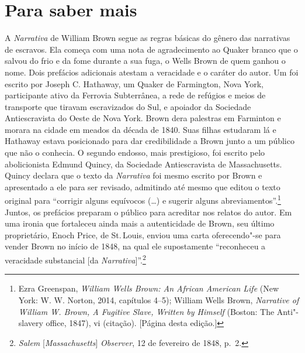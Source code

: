 \part{Para saber mais}


A \emph{Narrativa} de William Brown segue as regras básicas do gênero
das narrativas de escravos. Ela começa com uma nota de agradecimento ao
Quaker branco que o salvou do frio e da fome durante a sua fuga, o Wells %
Brown de quem ganhou o nome. Dois prefácios adicionais atestam a
veracidade e o caráter do autor. Um foi escrito por Joseph C. Hathaway,
um Quaker de Farmington, Nova York, participante ativo da Ferrovia
Subterrânea, a rede de refúgios e meios de transporte que tiravam
escravizados do Sul, e apoiador da Sociedade Antiescravista do Oeste de Nova
York. Brown dera palestras em Farminton e morara na cidade em meados da
década de 1840. Suas filhas estudaram lá e Hathaway estava posicionado
para dar credibilidade a Brown junto a um público que não o conhecia. O
segundo endosso, mais prestigioso, foi escrito pelo abolicionista Edmund
Quincy, da Sociedade Antiescravista de Massachusetts. Quincy declara que
o texto da \emph{Narrativa} foi mesmo escrito por Brown e apresentado a
ele para ser revisado, admitindo até mesmo que editou o texto original
para ``corrigir alguns equívocos (\ldots{}) e sugerir alguns
abreviamentos''.\footnote{Ezra Greenspan, \emph{William Wells Brown: An
  African American Life} (New York: W. W. Norton, 2014, capítulos 4--5);
  William Wells Brown, \emph{Narrative of William W. Brown, A Fugitive
  Slave, Written by Himself} (Boston: The Anti"-slavery office, 1847), vi
  (citação). {[}Página \pageref{ref1} desta edição.{]}} Juntos, os prefácios
preparam o público para acreditar nos relatos do autor. Em uma ironia
que fortaleceu ainda mais a autenticidade de Brown, seu último
proprietário, Enoch Price, de St.\,Louis, enviou uma carta oferecendo"-se
para vender Brown no início de 1848, na qual ele supostamente
``reconheceu a veracidade substancial {[}da
\emph{Narrativa}{]}''.\footnote{\emph{Salem} {[}\emph{Massachusetts}{]}
  \emph{Observer}, 12 de fevereiro de 1848, p.~2.}

